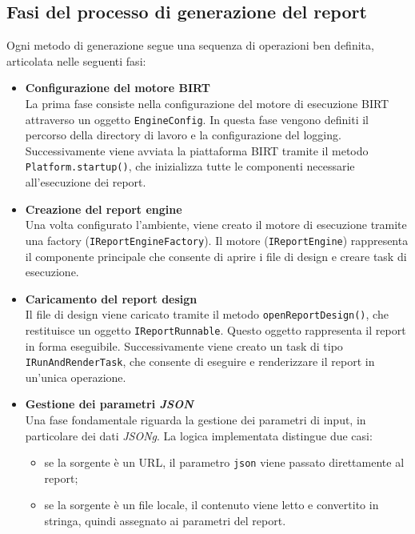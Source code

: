 \subsection{Fasi del processo di generazione del report}

Ogni metodo di generazione segue una sequenza di operazioni ben definita, articolata nelle seguenti fasi:

\begin{itemize}
    \item {\textbf{Configurazione del motore BIRT}}\\
    La prima fase consiste nella configurazione del motore di esecuzione BIRT attraverso un oggetto \texttt{EngineConfig}. In questa fase vengono definiti il percorso della directory di lavoro e la configurazione del logging.\\
    Successivamente viene avviata la piattaforma BIRT tramite il metodo \texttt{Platform.startup()}, che inizializza tutte le componenti necessarie all'esecuzione dei report.
    \item {\textbf{Creazione del report engine}}\\
    Una volta configurato l'ambiente, viene creato il motore di esecuzione tramite una factory (\texttt{IReportEngineFactory}). Il motore (\texttt{IReportEngine}) rappresenta il componente principale che consente di aprire i file di design e creare task di esecuzione.
    \item {\textbf{Caricamento del report design}}\\
    Il file di design viene caricato tramite il metodo \texttt{openReportDesign()}, che restituisce un oggetto \texttt{IReportRunnable}. Questo oggetto rappresenta il report in forma eseguibile.
    Successivamente viene creato un task di tipo \texttt{IRunAndRenderTask}, che consente di eseguire e renderizzare il report in un'unica operazione.
    \item{\textbf{Gestione dei parametri \emph{JSON}}}\\
    Una fase fondamentale riguarda la gestione dei parametri di input, in particolare dei dati \emph{\gls{JSONg}}.
    La logica implementata distingue due casi:
    \begin{itemize}
        \item se la sorgente è un URL, il parametro \texttt{json} viene passato direttamente al report;
        \item se la sorgente è un file locale, il contenuto viene letto e convertito in stringa, quindi assegnato ai parametri del report.
    \end{itemize}

\end{itemize}
